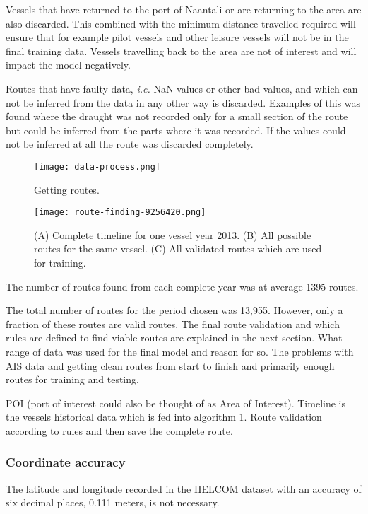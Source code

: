 \documentclass[../main.tex]{subfiles}
\begin{document}
Vessels that have returned to the port of Naantali or are returning to the area are also discarded. This combined with the minimum distance travelled required will ensure that for example pilot vessels and other leisure vessels will not be in the final training data. Vessels travelling back to the area are not of interest and will impact the model negatively.

Routes that have faulty data, \textit{i.e.} NaN values or other bad values, and which can not be inferred from the data in any other way is discarded. Examples of this was found where the draught was not recorded only for a small section of the route but could be inferred from the parts where it was recorded. If the values could not be inferred at all the route was discarded completely.

\begin{figure}[H]
	\centering
	\texttt{[image: data-process.png]}
	\caption{Getting routes.}
	\label{fig:flowchart}
\end{figure}

\begin{figure}[H]
	\centering
	\texttt{[image: route-finding-9256420.png]}
	\caption{(A) Complete timeline for one vessel year 2013. (B) All possible routes for the same vessel. (C) All validated routes which are used for training. }
	\label{fig:route-finding}
\end{figure}

The number of routes found from each complete year was at average 1395 routes. 

The total number of routes for the period chosen was 13,955. However, only a fraction of these routes are valid routes. The final route validation and which rules are defined to find viable routes are explained in the next section.
What range of data was used for the final model and reason for so. The problems with AIS data and getting clean routes from start to finish and primarily enough routes for training and testing. 

POI (port of interest could also be thought of as Area of Interest). Timeline is the vessels historical data which is fed into algorithm 1. Route validation according to rules and then save the complete route.

\subsubsection{Coordinate accuracy}

The latitude and longitude recorded in the HELCOM dataset with an accuracy of six decimal places, 0.111 meters, is not necessary.
\end{document}
